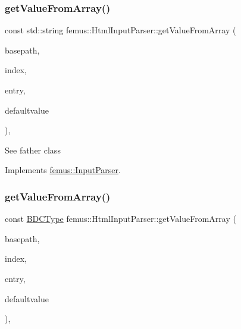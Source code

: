 \mbox{\label{classfemus_1_1_html_input_parser_a6ea19a89092720479eadfb46d38e5b7a}} 
\subsubsection{\texorpdfstring{get\+Value\+From\+Array()}{getValueFromArray()}\hspace{0.1cm}{\footnotesize\ttfamily [1/2]}}
{\footnotesize\ttfamily const std\+::string femus\+::\+Html\+Input\+Parser\+::get\+Value\+From\+Array (\begin{DoxyParamCaption}\item[{const std\+::string \&}]{basepath,  }\item[{const unsigned int}]{index,  }\item[{const std\+::string}]{entry,  }\item[{const std\+::string}]{defaultvalue }\end{DoxyParamCaption})\hspace{0.3cm}{\ttfamily [inline]}, {\ttfamily [virtual]}}

See father class 

Implements \mbox{\hyperlink{classfemus_1_1_input_parser_a08f0f52e28b4e9dfc5dcf7c1ba267938}{femus\+::\+Input\+Parser}}.

\mbox{\label{classfemus_1_1_html_input_parser_a243d191b91055db6ab63123774360377}} 
\subsubsection{\texorpdfstring{get\+Value\+From\+Array()}{getValueFromArray()}\hspace{0.1cm}{\footnotesize\ttfamily [2/2]}}
{\footnotesize\ttfamily const \mbox{\hyperlink{_b_d_c_type_enum_8hpp_ac1efcf28f6f152fe5354b888f616668d}{B\+D\+C\+Type}} femus\+::\+Html\+Input\+Parser\+::get\+Value\+From\+Array (\begin{DoxyParamCaption}\item[{const std\+::string \&}]{basepath,  }\item[{const unsigned int}]{index,  }\item[{const std\+::string}]{entry,  }\item[{const \mbox{\hyperlink{_b_d_c_type_enum_8hpp_ac1efcf28f6f152fe5354b888f616668d}{B\+D\+C\+Type}}}]{defaultvalue }\end{DoxyParamCaption})\hspace{0.3cm}{\ttfamily [inline]}, {\ttfamily [virtual]}}

